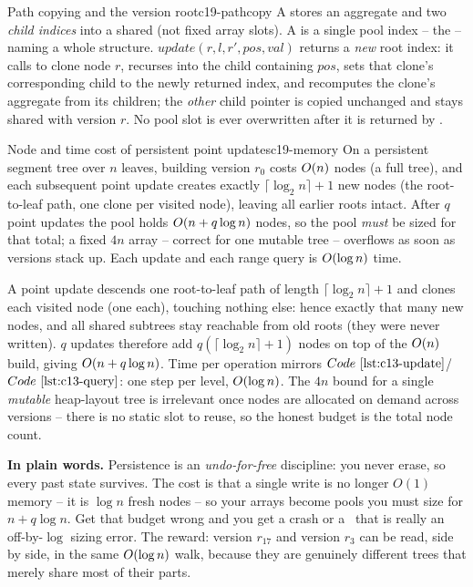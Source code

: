 \begin{definition}{Path copying and the version root}{c19-pathcopy}
A  stores an aggregate and two \emph{child indices} into a shared  (not fixed array slots).  A  is a single pool index -- the  -- naming a whole structure.  \(\mathit{update}(r, l, r', \mathit{pos}, \mathit{val})\) returns a \emph{new} root index: it calls  to clone node \(r\), recurses into the child containing \(\mathit{pos}\), sets that clone's corresponding child to the newly returned index, and recomputes the clone's aggregate from its children; the \emph{other} child pointer is copied unchanged and stays shared with version \(r\).  No pool slot is ever overwritten after it is returned by .
\end{definition}

\begin{theorem}{Node and time cost of persistent point updates}{c19-memory}
On a persistent segment tree over \(n\) leaves, building version \(r_0\) costs \(O(n)\) nodes (a full tree), and each subsequent point update creates exactly \(\lceil\log_2 n\rceil + 1\) new nodes (the root-to-leaf path, one clone per visited node), leaving all earlier roots intact.  After \(q\) point updates the pool holds \(O(n + q\log n)\) nodes, so the pool \emph{must} be sized for that total; a fixed \(4n\) array -- correct for one mutable tree -- overflows as soon as versions stack up.  Each update and each range query is \(O(\log n)\) time.
\end{theorem}
\begin{proofbox}
A point update descends one root-to-leaf path of length \(\lceil\log_2 n\rceil+1\) and clones each visited node (one  each), touching nothing else: hence exactly that many new nodes, and all shared subtrees stay reachable from old roots (they were never written).  \(q\) updates therefore add \(q(\lceil\log_2 n\rceil+1)\) nodes on top of the \(O(n)\) build, giving \(O(n+q\log n)\).  Time per operation mirrors \(\coderef{c13-update}\)/\(\coderef{c13-query}\): one step per level, \(O(\log n)\).  The \(4n\) bound for a single \emph{mutable} heap-layout tree is irrelevant once nodes are allocated on demand across versions -- there is no static slot to reuse, so the honest budget is the total node count.
\end{proofbox}

\noindent\textbf{In plain words.}  Persistence is an \emph{undo-for-free} discipline: you never erase, so every past state survives.  The cost is that a single write is no longer \(O(1)\) memory -- it is \(\log n\) fresh nodes -- so your arrays become pools you must size for \(n + q\log n\).  Get that budget wrong and you get a crash or a \mle\ that is really an off-by-\(\log\) sizing error.  The reward: version \(r_{17}\) and version \(r_{3}\) can be read, side by side, in the same \(O(\log n)\) walk, because they are genuinely different trees that merely share most of their parts.

